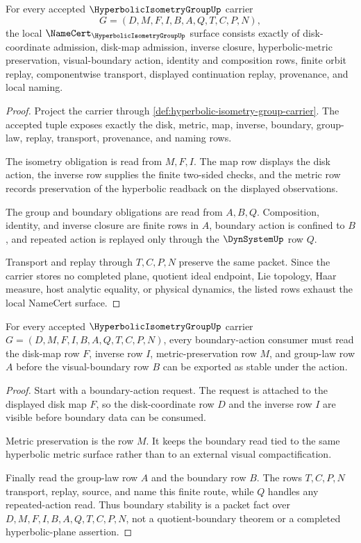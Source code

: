\begin{theorem}
\label{thm:hyperbolic-isometry-group-namecert-obligations}
For every accepted $\HyperbolicIsometryGroupUp$ carrier
$$
G=(D,M,F,I,B,A,Q,T,C,P,N),
$$
the local $\NameCert_{\HyperbolicIsometryGroupUp}$ surface consists exactly of disk-coordinate admission, disk-map admission, inverse closure, hyperbolic-metric preservation, visual-boundary action, identity and composition rows, finite orbit replay, componentwise transport, displayed continuation replay, provenance, and local naming.
\end{theorem}
\begin{proof}
Project the carrier through \autoref{def:hyperbolic-isometry-group-carrier}. The accepted tuple exposes exactly the disk, metric, map, inverse, boundary, group-law, replay, transport, provenance, and naming rows.

The isometry obligation is read from $M,F,I$. The map row displays the disk action, the inverse row supplies the finite two-sided checks, and the metric row records preservation of the hyperbolic readback on the displayed observations.

The group and boundary obligations are read from $A,B,Q$. Composition, identity, and inverse closure are finite rows in $A$, boundary action is confined to $B$, and repeated action is replayed only through the $\DynSystemUp$ row $Q$.

Transport and replay through $T,C,P,N$ preserve the same packet. Since the carrier stores no completed plane, quotient ideal endpoint, Lie topology, Haar measure, host analytic equality, or physical dynamics, the listed rows exhaust the local NameCert surface.
\end{proof}

\begin{theorem}
\label{thm:hyperbolic-isometry-group-boundary-action}
For every accepted $\HyperbolicIsometryGroupUp$ carrier $G=(D,M,F,I,B,A,Q,T,C,P,N)$, every boundary-action consumer must read the disk-map row $F$, inverse row $I$, metric-preservation row $M$, and group-law row $A$ before the visual-boundary row $B$ can be exported as stable under the action.
\end{theorem}
\begin{proof}
Start with a boundary-action request. The request is attached to the displayed disk map $F$, so the disk-coordinate row $D$ and the inverse row $I$ are visible before boundary data can be consumed.

Metric preservation is the row $M$. It keeps the boundary read tied to the same hyperbolic metric surface rather than to an external visual compactification.

Finally read the group-law row $A$ and the boundary row $B$. The rows $T,C,P,N$ transport, replay, source, and name this finite route, while $Q$ handles any repeated-action read. Thus boundary stability is a packet fact over $D,M,F,I,B,A,Q,T,C,P,N$, not a quotient-boundary theorem or a completed hyperbolic-plane assertion.
\end{proof}


